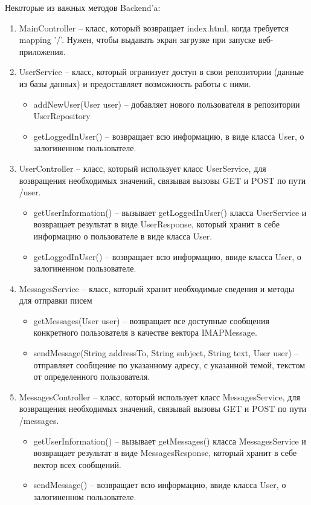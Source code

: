 \documentclass{article}
\begin{document}
Некоторые из важных методов Backend'a:
\begin{enumerate}
\item MainController -- класс, который возвращает index.html, когда требуется mapping '/'. Нужен, чтобы выдавать экран загрузке при запуске веб-приложения.

\item UserService -- класс, который огранизует доступ в свои репозитории (данные из базы данных) и предоставляет возможность работы с ними.
	\begin{itemize}
	\item addNewUser(User user) -- добавляет нового пользователя в репозитории UserRepository
	\item getLoggedInUser() -- возвращает всю информацию, в виде класса User, о залогиненном пользователе.
	\end{itemize}
	
\item UserController -- класс, который использует класс UserService, для возвращения необходимых значений, связывая вызовы GET и POST по пути /user.
	\begin{itemize}
	\item getUserInformation() -- вызывает getLoggedInUser() класса UserService и возвращает результат в виде UserResponse, который хранит в себе информацию о пользователе в виде класса User.
	\item getLoggedInUser() -- возвращает всю информацию, ввиде класса User, о залогиненном пользователе.
	\end{itemize}
	
\item MessagesService -- класс, который хранит необходимые сведения и методы для отправки писем
	\begin{itemize}
	\item getMessages(User user) -- возвращает все доступные сообщения конкретного пользователя в качестве вектора IMAPMessage.
	\item sendMessage(String addressTo, String subject, String text, User user) -- отправляет сообщение по указанному адресу, с указанной темой, текстом от определенного пользователя.
	\end{itemize}
	
\item MessagesController -- класс, который использует класс MessagesService, для возвращения необходимых значений, связывай вызовы GET и POST по пути /messages.
	\begin{itemize}
	\item getUserInformation() -- вызывает getMessages() класса MessagesService и возвращает результат в виде MessagesResponse, который хранит в себе вектор всех сообщений.
	\item sendMessage() -- возвращает всю информацию, ввиде класса User, о залогиненном пользователе.
	\end{itemize}
\end{enumerate}
\end{document}
